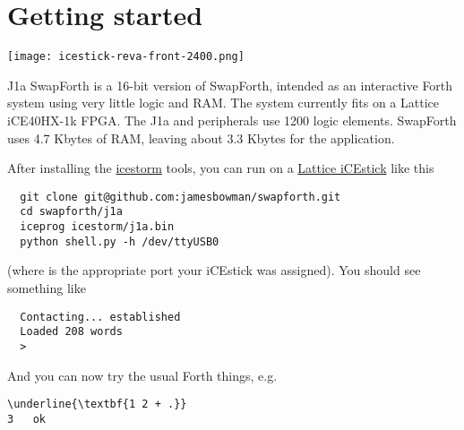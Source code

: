 \endgroup

\thispagestyle{empty}
\pagestyle{headings}

\tableofcontents

\chapter{Getting started}

\begin{center}
\texttt{[image: icestick-reva-front-2400.png]}
\end{center}

J1a SwapForth is a 16-bit version of SwapForth,
intended as an interactive Forth system using very little logic and RAM.
The system currently fits on a Lattice iCE40HX-1k FPGA. 
The J1a and peripherals use 1200 logic elements.
SwapForth uses 4.7 Kbytes of RAM,
leaving about 3.3 Kbytes for the application. 

After installing the    
\href{http://www.clifford.at/icestorm/}{icestorm}
tools, you can run on a
\href{http://www.latticesemi.com/icestick}{Lattice iCEstick}
like this

\begin{framed}
\begin{Verbatim}
  git clone git@github.com:jamesbowman/swapforth.git
  cd swapforth/j1a
  iceprog icestorm/j1a.bin
  python shell.py -h /dev/ttyUSB0
\end{Verbatim}
\end{framed}

\noindent
(where  is the appropriate port your iCEstick was assigned).
You should see something like

\begin{framed}
\begin{Verbatim}
  Contacting... established
  Loaded 208 words
  >
\end{Verbatim}
\end{framed}

And you can now try the usual Forth things, e.g.

\begin{framed}
\begin{Verbatim}[commandchars=\\\{\}]
\underline{\textbf{1 2 + .}}
3   ok
\end{Verbatim}
\end{framed}

